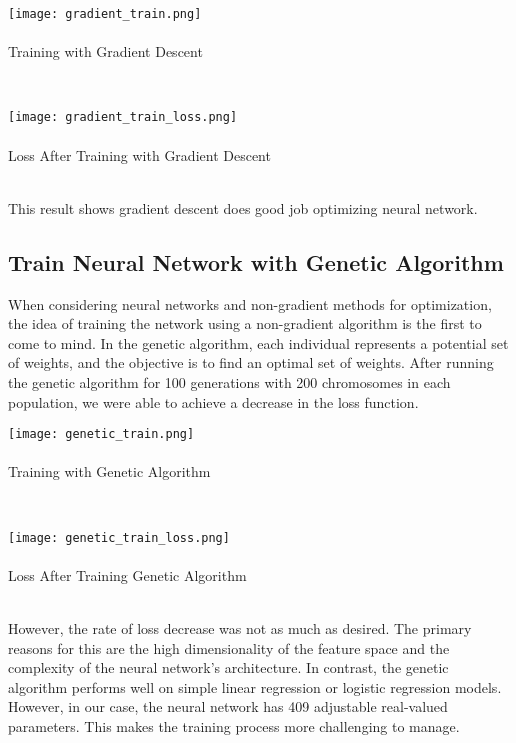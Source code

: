 \documentclass[conference]{IEEEtran}
\begin{document}
\begin{center}
\texttt{[image: gradient\_train.png]}\\ \ \\
\footnotesize{Training with Gradient Descent}
\end{center}\\ 

\begin{center}
\texttt{[image: gradient\_train\_loss.png]}\\ \ \\ 
\footnotesize{Loss After Training with Gradient Descent}
\end{center}\\ 

This result shows gradient descent does good job optimizing neural network.

\subsection{Train Neural Network with Genetic Algorithm}

When considering neural networks and non-gradient methods for optimization, the idea of training the network using a non-gradient algorithm is the first to come to mind. In the genetic algorithm, each individual represents a potential set of weights, and the objective is to find an optimal set of weights. After running the genetic algorithm for 100 generations with 200 chromosomes in each population, we were able to achieve a decrease in the loss function.

\begin{center}
\texttt{[image: genetic\_train.png]}\\ \ \\
\footnotesize{Training with Genetic Algorithm}
\end{center}\\
\begin{center}
\texttt{[image: genetic\_train\_loss.png]}\\ \ \\
\footnotesize{Loss After Training Genetic Algorithm}
\end{center}\\ 

However, the rate of loss decrease was not as much as desired. The primary reasons for this are the high dimensionality of the feature space and the complexity of the neural network's architecture. In contrast, the genetic algorithm performs well on simple linear regression or logistic regression models. However, in our case, the neural network has 409 adjustable real-valued parameters. This makes the training process more challenging to manage.
\end{document}
